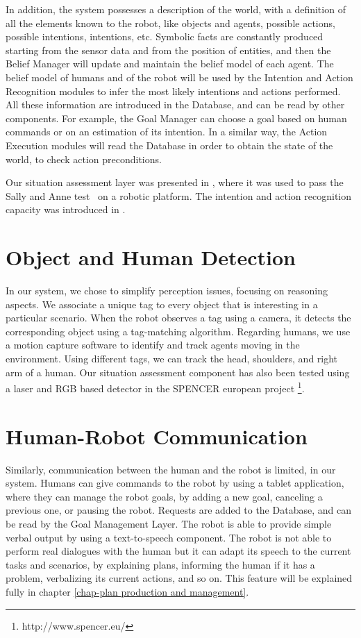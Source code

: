 In addition, the system possesses a description of the world, with a definition of all the elements known to the robot, like objects and agents, possible actions, possible intentions, intentions, etc. 
Symbolic facts are constantly produced starting from the sensor data and from the position of entities, and then the Belief Manager will update and maintain the belief model of each agent. The belief model of humans and of the robot will be used by the Intention and Action Recognition modules to infer the most likely intentions and actions performed. All these information are introduced in the Database, and can be read by other components. For example, the Goal Manager can choose a goal based on human commands or on an estimation of its intention. In a similar way, the Action Execution modules will read the Database in order to obtain the state of the world, to check action preconditions.  

Our situation assessment layer was presented in \cite{Milliez2014}, where it was used to pass the Sally and Anne test~\cite{Baron1985} on a robotic platform. The intention and action recognition capacity was introduced in \cite{devin2016some}.

\section{Object and Human Detection}
\label{sec:situation_assessment-object_human_detection}
In our system, we chose to simplify perception issues, focusing on reasoning aspects. We associate a unique tag to every object that is interesting in a particular scenario.  When the robot observes a tag using a camera, it detects the corresponding object using a tag-matching algorithm.
Regarding humans, we use a motion capture software to identify and track agents moving in the environment. Using different tags, we can track the head, shoulders, and right arm of a human. Our situation assessment component has also been tested using a laser and RGB based detector in the SPENCER european project \footnote{http://www.spencer.eu/}.



\section{Human-Robot Communication}
\label{sec:situation_assessment-communication}

Similarly, communication between the human and the robot is limited, in our system. Humans can give commands to the robot by using a tablet application, where they can manage the robot goals, by adding a new goal, canceling a previous one, or pausing the robot. Requests are added to the Database, and can be read by the Goal Management Layer. The robot is able to provide simple verbal output by using a text-to-speech component. The robot is not able to perform real dialogues with the human but it can adapt its speech to the current tasks and scenarios, by explaining plans, informing the human if it has a problem, verbalizing its current actions, and so on. This feature will be explained fully in chapter \ref{chap-plan production and management}. 

